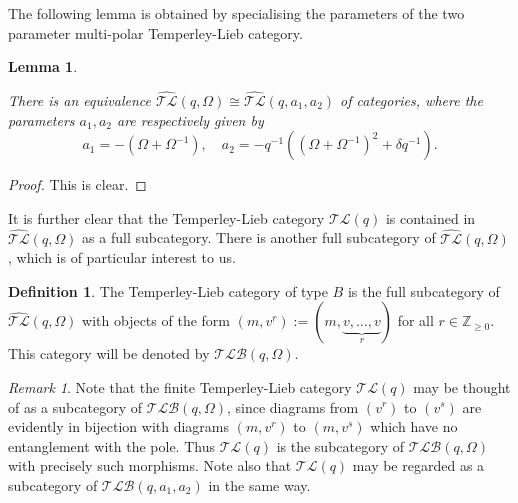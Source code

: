 \documentclass[12pt]{amsart}
\newtheorem{lemma}[theorem]{Lemma}
\theoremstyle{definition}
\newtheorem{definition}[theorem]{Definition}
\theoremstyle{remark}
\newtheorem{remark}[theorem]{Remark}
\numberwithin{equation}{section}
\newcommand{\Z}{{\mathbb Z}}
\newcommand{\tl}{Temperley-Lieb }
\newcommand{\ATLC}{{\widehat{\mathcal{TL}}}}
\newcommand{\TLC}{\mathcal{TL}}
\newcommand{\TLBC}{\mathcal{TLB}}
\begin{document}
The following lemma is obtained by specialising the parameters of the two parameter multi-polar \tl category. 
\begin{lemma}\label{lem:iso-tlcb-2}
\iffalse
The third skein relation in the definition of $\ATLC(q, \Omega)$ may be replaced by the following relation without changing the category. 
\[
\begin{picture}(70, 110)(40,0)
{
\linethickness{1mm}
\put(-15, 65){\line(0, 1){35}}
\put(-15, 25){\line(0, 1){35}}
\put(-15, 0){\line(0, 1){18}}
}

\qbezier(-19, 38)(-35, 30)(-15, 22)
\qbezier(-15, 62)(5, 55)(-11, 42)
\qbezier(-15, 62)(-35, 75)(-19, 85)

\qbezier(-11, 88)(15, 95)(10, 50)
\qbezier(-15, 22)(0, 15)(10, 50)
\put(25, 45){$=-q^{-1}\left((\Omega+\Omega^{-1})^2+\delta q^{-1}\right)$}
{
\linethickness{1mm}
\put(180, 0){\line(0, 1){100}}
\put(185, 0){.}
}
\end{picture}
\]
\fi
There is an equivalence $\ATLC(q, \Omega)\cong\ATLC(q, a_1,  a_2)$ of categories, where the parameters $a_1, a_2$ are respectively given by
\[
a_1=-(\Omega+\Omega^{-1}), \quad a_2=-q^{-1}((\Omega+\Omega^{-1})^2+\delta q^{-1}). 
\]
\end{lemma}
\begin{proof} 
This is clear. 
\end{proof}

%
%
%
%
It is further clear that the \tl category $\TLC(q)$ is contained in $\ATLC(q, \Omega)$ as a full subcategory. 
There is another full subcategory of $\ATLC(q, \Omega)$, which is of particular interest to us.
%
%
 \begin{definition}\label{def:tl(b)}
The Temperley-Lieb category of type $B$ is the full subcategory of $\ATLC(q, \Omega)$ with objects of the 
form $(m, v^r):=(m, \underbrace{v, \dots, v}_r)$ for all $r\in \Z_{\ge 0}$. This category will be denoted by  $\TLBC(q, \Omega)$.  
\end{definition}
%
%

\begin{remark}\label{rem:tlsub} Note that the finite \tl category $\TLC(q)$ may be thought of as a subcategory of $\TLBC(q,\Omega)$,
since diagrams from $(v^r)$ to $(v^s)$ are evidently in bijection with diagrams $(m,v^r)$ to $(m,v^s)$ which have no entanglement with the pole.
Thus $\TLC(q)$ is the subcategory of $\TLBC(q,\Omega)$ with precisely such morphisms.
Note also that $\TLC(q)$ may be regarded  as a subcategory of $\TLBC(q, a_1, a_2)$ in the same way.
\end{remark}
\end{document}
